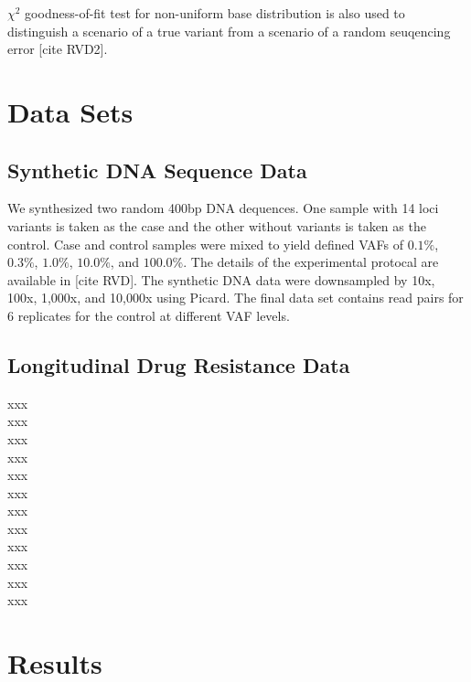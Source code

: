 \documentclass{article}
\begin{document}
$\chi^2$ goodness-of-fit test for non-uniform base distribution is also used to distinguish a scenario of a true variant from a scenario of a random seuqencing error [cite RVD2]. 


\section{Data Sets}
\subsection{Synthetic DNA Sequence Data}
We synthesized two random 400bp DNA dequences. One sample with 14 loci variants is taken as the case and the other without variants is taken as the control.
Case and control samples were mixed to yield defined VAFs of $0.1\%$, $0.3\%$, $1.0\%$, $10.0\%$, and $100.0\%$.
The details of the experimental protocal are available in [cite RVD].
The synthetic DNA data were downsampled by 10x, 100x, 1,000x, and 10,000x using Picard.
The final data set contains read pairs for 6 replicates for the control at different VAF levels.

\subsection{Longitudinal Drug Resistance Data}
xxx\\
xxx\\
xxx\\
xxx\\
xxx\\
xxx\\
xxx\\
xxx\\
xxx\\
xxx\\
xxx\\
xxx\\


\section{Results}
\end{document}
